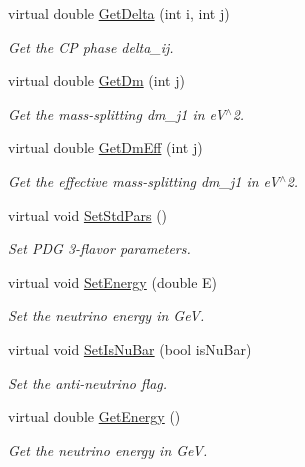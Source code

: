 \begin{DoxyCompactItemize}
virtual double \hyperlink{classOscProb_1_1PMNS__Base_adb8dbc91d4286d2e7c8f768c59476241}{Get\+Delta} (int i, int j)
\begin{DoxyCompactList}\small\item\em Get the CP phase delta\+\_\+ij. \end{DoxyCompactList}\item 
virtual double \hyperlink{classOscProb_1_1PMNS__Base_ad26815ac5f4805d1259817e4936e5f8f}{Get\+Dm} (int j)
\begin{DoxyCompactList}\small\item\em Get the mass-\/splitting dm\+\_\+j1 in e\+V$^\wedge$2. \end{DoxyCompactList}\item 
virtual double \hyperlink{classOscProb_1_1PMNS__Base_a4ea861a6707ce1be3a54aad2b60f8632}{Get\+Dm\+Eff} (int j)
\begin{DoxyCompactList}\small\item\em Get the effective mass-\/splitting dm\+\_\+j1 in e\+V$^\wedge$2. \end{DoxyCompactList}\item 
virtual void \hyperlink{classOscProb_1_1PMNS__Base_a4de96ac9b6d1e9b029ab877e57d211ad}{Set\+Std\+Pars} ()
\begin{DoxyCompactList}\small\item\em Set P\+DG 3-\/flavor parameters. \end{DoxyCompactList}\item 
virtual void \hyperlink{classOscProb_1_1PMNS__Base_a95b3b0d0cab5e6a54b5ef99587f837c0}{Set\+Energy} (double E)
\begin{DoxyCompactList}\small\item\em Set the neutrino energy in GeV. \end{DoxyCompactList}\item 
virtual void \hyperlink{classOscProb_1_1PMNS__Base_a717e0348cf762f3961854e332a9b52e0}{Set\+Is\+Nu\+Bar} (bool is\+Nu\+Bar)
\begin{DoxyCompactList}\small\item\em Set the anti-\/neutrino flag. \end{DoxyCompactList}\item 
virtual double \hyperlink{classOscProb_1_1PMNS__Base_acc0d46cc4b8f911b40b807225003bbed}{Get\+Energy} ()
\begin{DoxyCompactList}\small\item\em Get the neutrino energy in GeV. \end{DoxyCompactList}\item 

\end{DoxyCompactItemize}
